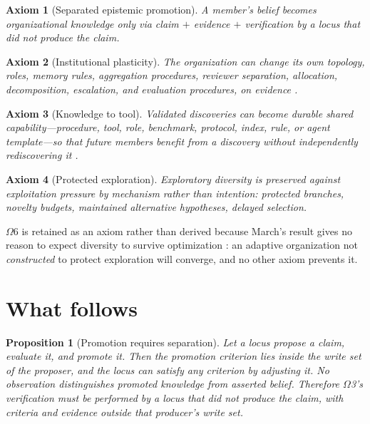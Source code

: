 \documentclass[11pt]{article}
\newtheorem{proposition}{Proposition}
\newtheorem{axiom}{Axiom}
\begin{document}
\begin{axiom}[Separated epistemic promotion]
A member's belief becomes organizational knowledge only via \emph{claim $+$ evidence $+$ verification by a locus that did not produce the claim}.
\end{axiom}

\begin{axiom}[Institutional plasticity]
The organization can change its own topology, roles, memory rules, aggregation procedures, reviewer separation, allocation, decomposition, escalation, and evaluation procedures, on evidence \citep{argyris1978organizational,ostrom1990governing}.
\end{axiom}

\begin{axiom}[Knowledge to tool]
Validated discoveries can become durable shared capability---procedure, tool, role, benchmark, protocol, index, rule, or agent template---so that future members benefit from a discovery without independently rediscovering it \citep{nonaka1994dynamic}.
\end{axiom}

\begin{axiom}[Protected exploration]
Exploratory diversity is preserved against exploitation pressure by mechanism rather than intention: protected branches, novelty budgets, maintained alternative hypotheses, delayed selection.
\end{axiom}

$\Omega$6 is retained as an axiom rather than derived because March's result gives no reason to expect diversity to survive optimization \citep{march1991exploration}: an adaptive organization not \emph{constructed} to protect exploration will converge, and no other axiom prevents it.

\section{What follows}

\begin{proposition}[Promotion requires separation]\label{prop:sep}
Let a locus propose a claim, evaluate it, and promote it. Then the promotion criterion lies inside the write set of the proposer, and the locus can satisfy any criterion by adjusting it. No observation distinguishes promoted knowledge from asserted belief. Therefore $\Omega$3's verification must be performed by a locus that did not produce the claim, with criteria and evidence outside that producer's write set.
\end{proposition}
\end{document}
